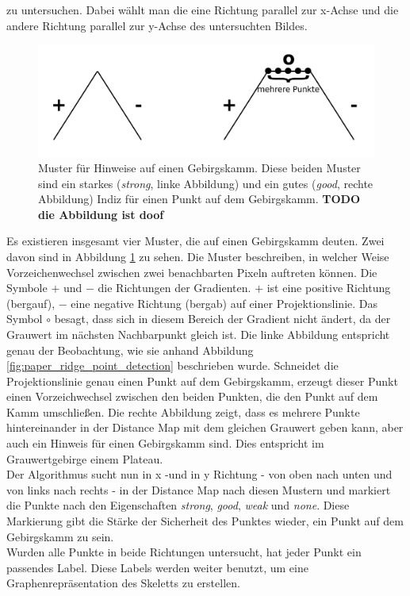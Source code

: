 zu untersuchen. Dabei wählt man die eine Richtung parallel zur x-Achse und die andere Richtung parallel zur y-Achse des untersuchten Bildes.
\begin{figure}
\centering
\includegraphics[width=0.8\linewidth]{./fig/muster_strong_good}
\caption{Muster für Hinweise auf einen Gebirgskamm. Diese beiden Muster sind ein starkes (\emph{strong}, linke Abbildung) und ein gutes (\emph{good}, rechte Abbildung) Indiz für einen Punkt auf dem Gebirgskamm. \textbf{TODO die Abbildung ist doof}}
\label{fig:muster_strong_good}
\end{figure}
Es existieren insgesamt vier Muster, die auf einen Gebirgskamm deuten. Zwei davon sind in Abbildung \ref{fig:muster_strong_good}
zu sehen. Die Muster beschreiben, in welcher Weise Vorzeichenwechsel zwischen zwei benachbarten Pixeln auftreten können. Die Symbole $+$ und $-$ die Richtungen der Gradienten. $+$ ist eine positive Richtung (bergauf), $-$ eine negative Richtung (bergab) auf einer Projektionslinie. Das Symbol $\circ$ besagt, dass sich in diesem Bereich der Gradient nicht ändert, da der Grauwert im nächsten Nachbarpunkt gleich ist. Die linke Abbildung entspricht genau der Beobachtung, wie sie anhand Abbildung
\ref{fig:paper_ridge_point_detection} beschrieben wurde. Schneidet die Projektionslinie genau einen Punkt auf dem Gebirgskamm,
erzeugt dieser Punkt einen Vorzeichwechsel zwischen den beiden Punkten, die den Punkt auf dem Kamm umschließen. Die rechte
Abbildung zeigt, dass es mehrere Punkte hintereinander in der Distance Map mit dem gleichen Grauwert geben kann, aber auch ein
Hinweis für einen Gebirgskamm sind. Dies entspricht im Grauwertgebirge einem Plateau.\\
Der Algorithmus sucht nun in x -und in y Richtung - von oben nach unten und von links nach rechts - in der Distance Map nach diesen Mustern und markiert die Punkte nach den Eigenschaften \emph{strong}, \emph{good}, \emph{weak} und \emph{none}. 
Diese Markierung gibt die Stärke der Sicherheit des Punktes wieder, ein Punkt auf dem Gebirgskamm zu sein. \\
Wurden alle Punkte in beide Richtungen untersucht, hat jeder Punkt ein passendes Label. Diese Labels werden weiter benutzt, um eine Graphenrepräsentation des Skeletts zu erstellen.\\
